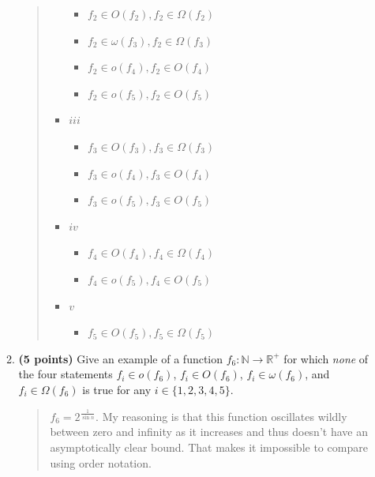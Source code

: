 \documentclass[11pt]{article}
\begin{document}
\begin{enumerate}[leftmargin=*]
\begin{enumerate}
\begin{quote}
\begin{itemize}
\begin{itemize}
      \item $f_2 \in O(f_2), f_2 \in \Omega(f_2)$ 
      \item $f_2 \in \omega(f_3), f_2 \in \Omega(f_3)$ 
      \item $f_2 \in o(f_4), f_2 \in O(f_4)$ 
      \item $f_2 \in o(f_5), f_2 \in O(f_5)$ 
    \end{itemize}
    \item $iii$
    \begin{itemize}
      \item $f_3 \in O(f_3), f_3 \in \Omega(f_3)$ 
      \item $f_3 \in o(f_4), f_3 \in O(f_4)$ 
      \item $f_3 \in o(f_5), f_3 \in O(f_5)$ 
    \end{itemize}
    \item $iv$
    \begin{itemize}
      \item $f_4 \in O(f_4), f_4 \in \Omega(f_4)$ 
      \item $f_4 \in o(f_5), f_4 \in O(f_5)$ 
    \end{itemize}
    \item $v$ 
    \begin{itemize}
      \item $f_5 \in O(f_5), f_5 \in \Omega(f_5)$ 
    \end{itemize}
  \end{itemize}
  
\end{quote}
\item
{\bf (5 points)}
Give an example of a function $f_6: \mathbb{N} \to \mathbb{R}^+$ for which \emph{none} of the four statements $f_i \in o(f_6)$, $f_i \in O(f_6)$, $f_i \in \omega(f_6)$, and $f_i \in \Omega(f_6)$ is true for any $i \in \{1,2,3,4,5\}$.
\begin{quote}
  \color{purple}
  $f_6 = 2^{\frac{1}{\sin n}}$. My reasoning is that this function oscillates wildly between zero and infinity as it increases and thus doesn't have an asymptotically clear bound. That makes it impossible to compare using order notation.
  
\end{quote}
\end{enumerate}


\end{enumerate}
\end{document}
